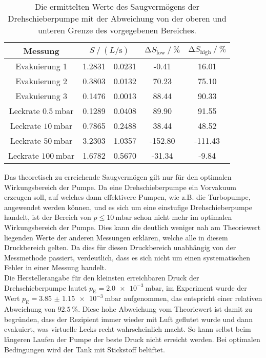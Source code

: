 \begin{table}
    \centering
    \caption{Die ermittelten Werte des Saugvermögens der Drehschieberpumpe mit der Abweichung von der oberen und unteren Grenze des vorgegebenen Bereiches.}
    \label{tab:compare_dreh}
    \begin{tabular}{c | S @{${}\pm{}$} S  S[table-format=4.2] S[table-format=4.2]}
        \toprule
        {Messung} &  & {$\increment S_\text{low} \mathbin{/} \si{\percent}$} & {$\increment S_\text{high} \mathbin{/} \si{\percent}$} \\ 
        \midrule
        Evakuierung 1                   & 1.2831 & 0.0231 & -0.41 &  16.01 \\
        Evakuierung 2                   & 0.3803 & 0.0132 & 70.23 &  75.10 \\
        Evakuierung 3                   & 0.1476 & 0.0013 & 88.44 &  90.33 \\
        Leckrate $\SI{0.5}{\milli\bar}$ & 0.1289 & 0.0408 & 89.90 &  91.55 \\
        Leckrate $\SI{10}{\milli\bar}$  & 0.7865 & 0.2488 & 38.44 &  48.52 \\
        Leckrate $\SI{50}{\milli\bar}$  & 3.2303 & 1.0357 &-152.80&-111.43 \\
        Leckrate $\SI{100}{\milli\bar}$ & 1.6782 & 0.5670 &-31.34 &  -9.84 \\
        \bottomrule
    \end{tabular}
\end{table}

\noindent Das theoretisch zu erreichende Saugvermögen gilt nur für den optimalen Wirkungsbereich der Pumpe. Da eine Drehschieberpumpe ein Vorvakuum erzeugen soll, auf welches dann effektivere Pumpen, 
wie z.B. die Turbopumpe, angewendet werden können, und es sich um eine einstufige Drehschieberpumpe handelt, ist der Bereich von $p \leq \SI{10}{\milli\bar}$ schon nicht mehr im optimalen 
Wirkungsbereich der Pumpe. Dies kann die deutlich weniger nah am Theoriewert liegenden Werte der anderen Messungen erklären, welche alle in diesem Druckbereich gelten. 
Da dies für diesen Druckbereich unabhängig von der Messmethode passiert, verdeutlich, dass es sich nicht um einen systematischen Fehler in einer Messung handelt. \\ 
Die Herstellerangabe für den kleinsten erreichbaren Druck der Drehschieberpumpe lautet $p_\text{E} = \SI{2.0e-3}{\milli\bar}$, im Experiment wurde der Wert 
$p_\text{E} = \SI{3.85(115)e-3}{\milli\bar}$ aufgenommen, das entspricht einer relativen Abweichung von $\SI{92.5}{\percent}$. Diese hohe Abweichung vom Theoriewert ist damit zu begründen, 
dass der Rezipient immer wieder mit Luft geflutet wurde und dann evakuiert, was virtuelle Lecks recht wahrscheinlich macht. So kann selbst beim längeren Laufen der Pumpe der beste Druck 
nicht erreicht werden. Bei optimalen Bedingungen wird der Tank mit Stickstoff belüftet. 



